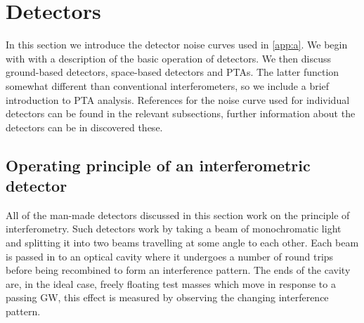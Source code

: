 \section{Detectors}\label{sec:detectors}

In this section we introduce the detector noise curves used in \ref{app:a}. We begin with with a description of the basic operation of detectors. We then discuss ground-based detectors, space-based detectors and PTAs. The latter function somewhat different than conventional interferometers, so we include a brief introduction to PTA analysis. References for the noise curve used for individual detectors can be found in the relevant subsections, further information about the detectors can be in discovered these.

\subsection{Operating principle of an interferometric detector}\label{sec:principles}

All of the man-made detectors discussed in this section work on the principle of interferometry. Such detectors work by taking a beam of monochromatic light and splitting it into two beams travelling at some angle to each other. Each beam is passed in to an optical cavity where it undergoes a number of round trips before being recombined to form an interference pattern. The ends of the cavity are, in the ideal case, freely floating test masses which move in response to a passing GW, this effect is measured by observing the changing interference pattern. %

